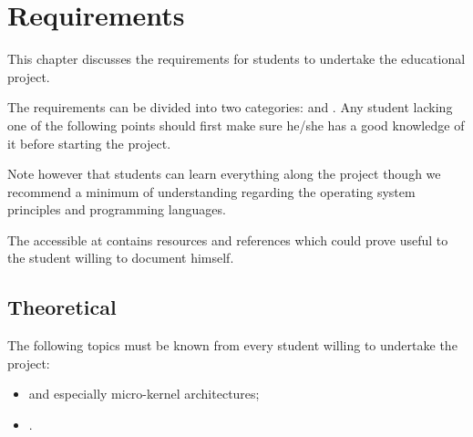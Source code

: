 %
%
%
%
%
%

%
%

\chapter{Requirements}
\label{chapter:requirements}

This chapter discusses the requirements for students to undertake the
 educational project.

\newpage

%
%

The requirements can be divided into two categories:  and
. Any student lacking one of the following points should
first make sure he/she has a good knowledge of it before starting the
project.

Note however that students can learn everything along the project though we
recommend a minimum of understanding regarding the operating system principles
and programming languages.

The   accessible at 
contains resources and references which could prove useful to the student
willing to document himself.

%
%

\section{Theoretical}

The following topics must be known from every student willing to undertake
the project:

\begin{itemize}
  \item
     and especially micro-kernel
    architectures;
  \item
    .
\end{itemize}

%
%

